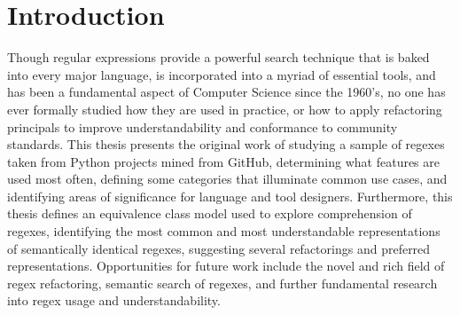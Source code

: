 \section{Introduction}

Though regular expressions provide a powerful search technique that is baked into every major language, is incorporated into a myriad of essential tools, and has been a fundamental aspect of Computer Science since the 1960's, no one has ever formally studied how they are used in practice, or how to apply refactoring principals to improve understandability and conformance to community standards.  This thesis presents the original work of studying a sample of regexes taken from Python projects mined from GitHub, determining what features are used most often, defining some categories that illuminate common use cases, and identifying areas of significance for language and tool designers.  Furthermore, this thesis defines an equivalence class model used to explore comprehension of regexes, identifying the most common and most understandable representations of semantically identical regexes, suggesting several refactorings and preferred representations.  Opportunities for future work include the novel and rich field of regex refactoring, semantic search of regexes, and further fundamental research into regex usage and understandability.
